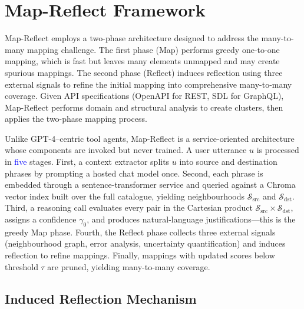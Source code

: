 \documentclass[sigconf, nonacm]{acmart}
\newcommand{\deleted}[1]{\textcolor{red}{#1}}
\newcommand{\added}[1]{\textcolor{blue}{#1}}
\begin{document}
\section{Map-Reflect Framework}
\label{sec:mapreflect}


Map-Reflect employs a two-phase architecture designed to address the many-to-many mapping challenge. The first phase (Map) performs greedy one-to-one mapping, which is fast but leaves many elements unmapped and may create spurious mappings. The second phase (Reflect) induces reflection using three external signals to refine the initial mapping into comprehensive many-to-many coverage. Given API specifications (OpenAPI for REST, SDL for GraphQL), Map-Reflect performs domain and structural analysis to create clusters, then applies the two-phase mapping process.

Unlike GPT-4–centric tool agents, Map-Reflect is a service-oriented architecture whose components are invoked but never trained. A user utterance $u$ is processed in \added{five} stages. First, a context extractor splits $u$ into source and destination phrases by prompting a hosted chat model once. Second, each phrase is embedded through a sentence-transformer service and queried against a Chroma vector index built over the full catalogue, yielding neighbourhoods $\mathcal{S}_{\mathrm{src}}$ and $\mathcal{S}_{\mathrm{dst}}$. Third, a reasoning call evaluates every pair in the Cartesian product $\mathcal{S}_{\mathrm{src}}\times\mathcal{S}_{\mathrm{dst}}$, assigns a confidence $\gamma_0$, and produces natural-language justifications—this is the greedy Map phase. Fourth, the Reflect phase collects three external signals (neighbourhood graph, error analysis, uncertainty quantification) and induces reflection to refine mappings. Finally, mappings with updated scores below threshold $\tau$ are pruned, yielding many-to-many coverage.

\subsection{Induced Reflection Mechanism}
\end{document}
